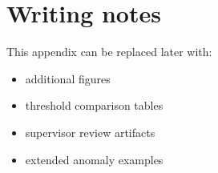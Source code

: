\section{Writing notes}

This appendix can be replaced later with:

\begin{itemize}
\item additional figures
\item threshold comparison tables
\item supervisor review artifacts
\item extended anomaly examples
\end{itemize}
